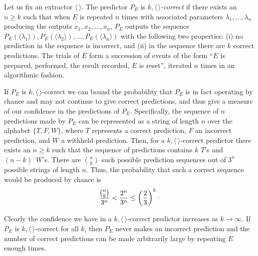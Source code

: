 \documentclass[%
 superscriptaddress,
 preprint,
 showpacs,
 showkeys,
 preprintnumbers,
  amsmath,amssymb,
  aps,
 pra,
  longbibliography,
  floatfix,
 ]{revtex4-1}
\theoremstyle{definition}
\newcommand{\rb}{\raisebox{0.5ex}}
\begin{document}
Let us fix an extractor $\langle \, \rangle$. The predictor $P_E$ is {\em $k,\langle \, \rangle$-correct} if there exists an $n\ge k$ such that when $E$ is repeated $n$ times with associated parameters $\lambda_1 ,\dots, \lambda_n$ producing the outputs $x_1,x_2,\dots ,x_n$, $P_E$ outputs the sequence $P_E(\langle\lambda_1\rangle), P_E(\langle\lambda_2\rangle),\dots ,P_E(\langle\lambda_n\rangle)$ with the following two properties:  (i) no prediction in the sequence is incorrect, and (ii) in the sequence there are $k$ correct predictions.
The trials of $E$ form a succession of events of the form ``$E$ is prepared, performed, the result recorded, $E$ is reset'', iterated $n$ times in an algorithmic fashion.

If $P_E$ is $k,\langle \, \rangle$-correct we can bound the probability that $P_E$ is in fact operating by chance and may not continue to give correct predictions, and thus give a measure of our confidence in the predictions of $P_E$.
Specifically, the sequence of $n$ predictions made by $P_E$ can be represented as a string of length $n$ over the alphabet $\{T,F,W\}$, where $T$ represents a correct prediction, $F$ an incorrect prediction, and $W$ a withheld prediction.
Then, for a $k,\langle \, \rangle$-correct predictor there exists an $n\ge k$ such that the sequence of predictions contains $k$ $T$'s and $(n-k)\,$ $W$'s.
There are ${n \choose k}$ such possible prediction sequences out of $3^n$ possible strings of length $n$.
Thus, the probability that such a correct sequence would be produced by chance is
$$\frac{{n\choose k}}{3^n}<\frac{2^n}{3^n}\le \left(\frac{2}{3}\right)^k\rb.$$

Clearly the confidence we have in a $k,\langle \, \rangle$-correct predictor increases as $k\to\infty$.
If $P_E$ is $k,\langle \, \rangle$-correct for all $k$, then $P_E$ never makes an incorrect prediction and the number of correct predictions can be made arbitrarily large by repeating $E$ enough times.

\end{document}
